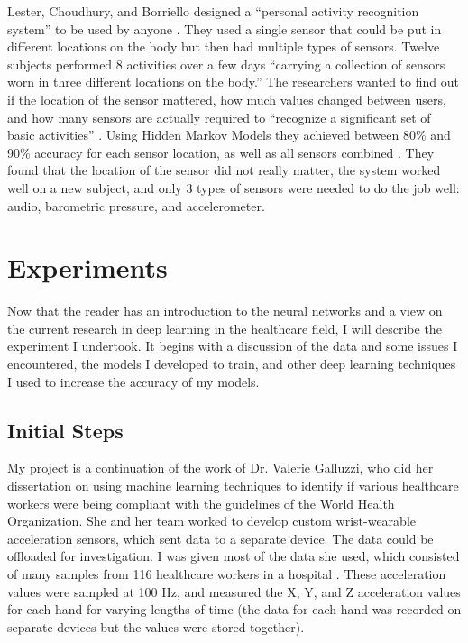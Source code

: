 \documentclass[]{report}
\begin{document}
Lester, Choudhury, and Borriello designed a ``personal activity recognition system'' to be used by anyone \cite{Lester2006}. They used a single sensor that could be put in different locations on the body but then had multiple types of sensors. Twelve subjects performed 8 activities over a few days ``carrying a collection of sensors worn in three different locations on the body.'' The researchers wanted to find out if the location of the sensor mattered, how much values changed between users, and how many sensors are actually required to ``recognize a significant set of basic activities'' \cite{Lester2006}.
Using Hidden Markov Models they achieved between 80\% and 90\% accuracy for each sensor location, as well as all sensors combined \cite{Bulling}. They found that the location of the sensor did not really matter, the system worked well on a new subject, and only 3 types of sensors were needed to do the job well: audio, barometric pressure, and accelerometer.


\chapter{Experiments}

Now that the reader has an introduction to the neural networks and a view on the current research in deep learning in the healthcare field, I will describe the experiment I undertook. It begins with a discussion of the data and some issues I encountered, the models I developed to train, and other deep learning techniques I used to increase the accuracy of my models.

\section{Initial Steps}

My project is a continuation of the work of Dr. Valerie Galluzzi, who did her dissertation on using machine learning techniques to identify if various healthcare workers were being compliant with the guidelines of the World Health Organization. She and her team worked to develop custom wrist-wearable acceleration sensors, which sent data to a separate device. The data could be offloaded for investigation. I was given most of the data she used, which consisted of many samples from 116 healthcare workers in a hospital \cite{Galluzzi}. These acceleration values were sampled at 100 Hz, and measured the X, Y, and Z acceleration values for each hand for varying lengths of time (the data for each hand was recorded on separate devices but the values were stored together). 
\end{document}
